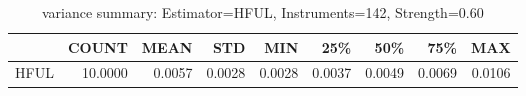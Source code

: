 \begin{table}[ht]
\centering
\caption{variance summary: Estimator=HFUL, Instruments=142, Strength=0.60}
\begin{tabular}{lrrrrrrrr}
\toprule
 & COUNT & MEAN & STD & MIN & 25\% & 50\% & 75\% & MAX \\
\midrule
HFUL & 10.0000 & 0.0057 & 0.0028 & 0.0028 & 0.0037 & 0.0049 & 0.0069 & 0.0106 \\
\bottomrule
\end{tabular}
\end{table}
